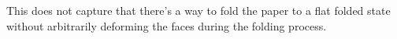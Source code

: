 


This does not capture that there's a way to fold the paper to a flat folded state without arbitrarily deforming the faces during the folding process.

